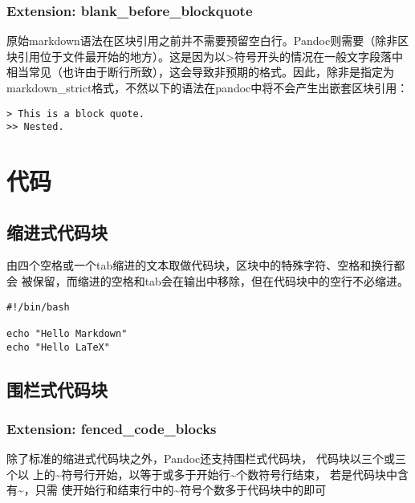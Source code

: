 \documentclass[cn]{elegantbook}
\begin{document}
\hypertarget{extension-blank_before_blockquote}{%
\subsubsection{Extension:
blank\_before\_blockquote}\label{extension-blank_before_blockquote}}

原始markdown语法在区块引用之前并不需要预留空白行。Pandoc则需要（除非区
块引用位于文件最开始的地方）。这是因为以\textgreater 符号开头的情况在一般文字段落中
相当常见（也许由于断行所致），这会导致非预期的格式。因此，除非是指定为
markdown\_strict格式，不然以下的语法在pandoc中将不会产生出嵌套区块引用：

\begin{lstlisting}
> This is a block quote.
>> Nested.
\end{lstlisting}

\hypertarget{ux4ee3ux7801}{%
\section{代码}\label{ux4ee3ux7801}}

\hypertarget{ux7f29ux8fdbux5f0fux4ee3ux7801ux5757}{%
\subsection{缩进式代码块}\label{ux7f29ux8fdbux5f0fux4ee3ux7801ux5757}}

由四个空格或一个tab缩进的文本取做代码块，区块中的特殊字符、空格和换行都会
被保留，而缩进的空格和tab会在输出中移除，但在代码块中的空行不必缩进。

\begin{lstlisting}
#!/bin/bash

echo "Hello Markdown"
echo "Hello LaTeX"
\end{lstlisting}

\hypertarget{ux56f4ux680fux5f0fux4ee3ux7801ux5757}{%
\subsection{围栏式代码块}\label{ux56f4ux680fux5f0fux4ee3ux7801ux5757}}

\hypertarget{extension-fenced_code_blocks}{%
\subsubsection{Extension:
fenced\_code\_blocks}\label{extension-fenced_code_blocks}}

除了标准的缩进式代码块之外，Pandoc还支持围栏式代码块，
代码块以三个或三个以
上的\textasciitilde 符号行开始，以等于或多于开始行\textasciitilde 个数符号行结束，
若是代码块中含有\textasciitilde，只需
使开始行和结束行中的\textasciitilde 符号个数多于代码块中的即可
\end{document}
